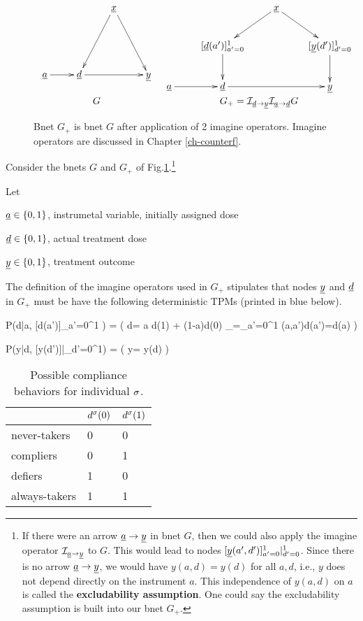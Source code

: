 \begin{figure}[h!]
$$
\begin{array}{ccccc}
\xymatrix{
&&\rvx\ar[ddl]\ar[ddr]
\\
\\
\rva\ar[r]
&\rvd\ar[rr]&&\rvy
}
&
\xymatrix{
&&\rvx\ar[dl]\ar[dr]
\\
&
[\rvd(a')]_{a'=0}^1\ar[d]
&
&[\rvy(d')]_{d'=0}^1\ar[d]
\\
\rva\ar[r]
&\rvd\ar[rr]&&\rvy
}
\\
G
&
G_+=
\cali_{\rvd\rarrow \rvy}
\cali_{\rva\rarrow \rvd}G
\end{array}
$$
\caption{
Bnet $G_+$ is bnet $G$
after application of 2
imagine operators.
Imagine operators
are discussed in Chapter \ref{ch-counterf}.
}
\label{fig-late-g-gplus}
\end{figure}

Consider
the bnets
$G$
and $G_+$
of 
Fig.\ref{fig-late-g-gplus}.\footnote{If there were an arrow
${\underline{a}}\rightarrow {\underline{y}}$
in bnet $G$,
then we could also
apply the imagine 
operator ${\cal I}_{{\underline{a}}\rightarrow
{\underline{y}}}$ to $G$.
This would lead to
nodes 
$[{\underline{y}}(a',d')]_{a'=0}^1|_{d'=0}^1$.
Since
there is no arrow
${\underline{a}}\rightarrow {\underline{y}}$, we would have
$y(a, d)=y(d)$
for all $a,d$,
i.e., $y$
does not depend
directly on 
the instrument $a$.
This independence
of $y(a,d)$ on $a$ is called the
{\bf excludability
assumption}.
One could say
the excludability
assumption
is built into
our bnet $G_+$.}

Let

${\underline{a}}\in \{0,1\}$, instrumetal
variable,
initially assigned dose

${\underline{d}}\in \{0,1\}$, actual treatment 
dose

${\underline{y}}\in \{0,1\}$, treatment outcome

The  definition of the 
imagine
operators 
used in $G_+$
stipulates
that nodes
${\underline{y}}$ and
${\underline{d}}$
in $G_{+}$
must be have the following
deterministic TPMs
(printed in blue below).


\beq\color{blue}
P(d|a,
[d(a')]_{a'=0}^1
) = \indi(\quad
d= \underbrace 
{a d(1) + (1-a)d(0)}
_{=\sum_{a'=0}^1
\delta(a,a')d(a')\quad=\quad d(a)}
\quad)
\eeq

\beq\color{blue}
P(y|d,
[y(d')]|_{d'=0}^1)
= \indi(\quad
y= 
y(d)
\quad)
\eeq

\begin{table}[h!]
\centering
\begin{tabular}{|l|l|l|}
\hline
 & \cellcolor[HTML]{ECF4FF}$d^\sigma(0)$ & \cellcolor[HTML]{ECF4FF}$d^\sigma(1)$ \\ \hline
\cellcolor[HTML]{ECF4FF}never-takers & 0 & 0 \\ \hline
\cellcolor[HTML]{ECF4FF}compliers & 0 & 1 \\ \hline
\cellcolor[HTML]{ECF4FF}defiers & 1 & 0 \\ \hline
\cellcolor[HTML]{ECF4FF}always-takers & 1 & 1 \\ \hline
\end{tabular}
\caption{Possible compliance
behaviors  for individual $\sigma$.}
\label{tab-late compliance}
\end{table}

